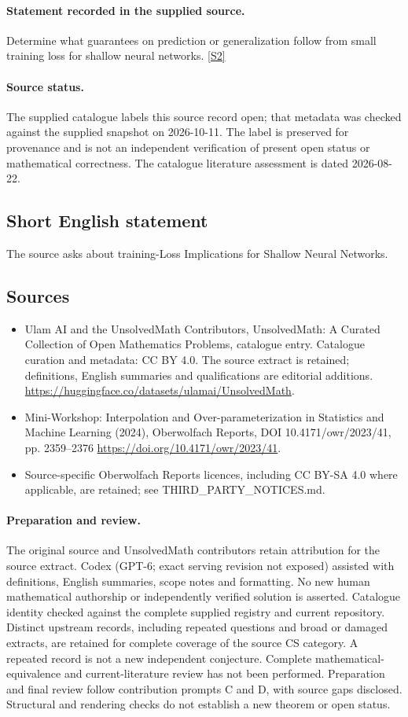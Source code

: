 \documentclass[11pt]{article}
\begin{document}
\paragraph{Statement recorded in the supplied source.}
Determine what guarantees on prediction or generalization follow from small training loss for shallow neural networks. \href{https://doi.org/10.4171/owr/2023/41}{[S2]}
\paragraph{Source status.}
The supplied catalogue labels this source record open; that metadata was checked against the supplied snapshot on 2026-10-11. The label is preserved for provenance and is not an independent verification of present open status or mathematical correctness. The catalogue literature assessment is dated 2026-08-22.
\subsection{Short English statement}
The source asks about training-Loss Implications for Shallow Neural Networks.
\subsection{Sources}
\begin{itemize}
\item[S1] Ulam AI and the UnsolvedMath Contributors, UnsolvedMath: A Curated Collection of Open Mathematics Problems, catalogue entry. Catalogue curation and metadata: CC BY 4.0. The source extract is retained; definitions, English summaries and qualifications are editorial additions.
\url{https://huggingface.co/datasets/ulamai/UnsolvedMath}.
\item[S2] Mini-Workshop: Interpolation and Over-parameterization in Statistics and Machine Learning​ (2024), Oberwolfach Reports, DOI 10.4171/owr/2023/41, pp. 2359--2376
\url{https://doi.org/10.4171/owr/2023/41}.
\item Source-specific Oberwolfach Reports licences, including CC BY-SA 4.0 where applicable, are retained; see THIRD\_PARTY\_NOTICES.md.
\end{itemize}
\paragraph{Preparation and review.}
The original source and UnsolvedMath contributors retain attribution for the source extract. Codex (GPT-6; exact serving revision not exposed) assisted with definitions, English summaries, scope notes and formatting. No new human mathematical authorship or independently verified solution is asserted. Catalogue identity checked against the complete supplied registry and current repository. Distinct upstream records, including repeated questions and broad or damaged extracts, are retained for complete coverage of the source CS category. A repeated record is not a new independent conjecture. Complete mathematical-equivalence and current-literature review has not been performed. Preparation and final review follow contribution prompts C and D, with source gaps disclosed. Structural and rendering checks do not establish a new theorem or open status.
\label{end:statement}
\end{document}
